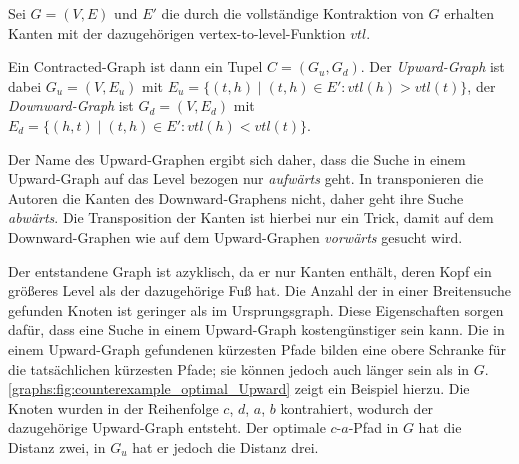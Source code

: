 \begin{definition}
  Sei $G = (V, E)$ und $E'$ die durch die vollständige Kontraktion von $G$ erhalten Kanten mit der dazugehörigen vertex-to-level-Funktion ${vtl}$.

  Ein Contracted-Graph ist dann ein Tupel $C = (G_u, G_d)$. Der \emph{Upward-Graph} ist dabei $G_u = (V, E_u)$ mit $E_u = \{ (t, h) \mid (t, h) \in E' \colon {vtl}(h) > {vtl}(t) \}$, der \emph{Downward-Graph} ist $G_d = (V, E_d)$ mit $E_d = \{ (h, t) \mid (t, h) \in E' \colon {vtl}(h) < {vtl}(t) \}$.
\end{definition}

Der Name des Upward-Graphen ergibt sich daher, dass die Suche in einem Upward-Graph auf das Level bezogen nur \emph{aufwärts} geht.
In \cite{geisberger2008contraction} transponieren die Autoren die Kanten des Downward-Graphens nicht, daher geht ihre Suche \emph{abwärts}.
Die Transposition der Kanten ist hierbei nur ein Trick, damit auf dem Downward-Graphen wie auf dem Upward-Graphen \emph{vorwärts} gesucht wird.

Der entstandene Graph ist azyklisch, da er nur Kanten enthält, deren Kopf ein größeres Level als der dazugehörige Fuß hat.
Die Anzahl der in einer Breitensuche gefunden Knoten ist geringer als im Ursprungsgraph.
Diese Eigenschaften sorgen dafür, dass eine Suche in einem Upward-Graph kostengünstiger sein kann.
Die in einem Upward-Graph gefundenen kürzesten Pfade bilden eine obere Schranke für die tatsächlichen kürzesten Pfade; sie können jedoch auch länger sein als in $G$.
\autoref{graphs:fig:counterexample_optimal_Upward} zeigt ein Beispiel hierzu.
Die Knoten wurden in der Reihenfolge $c$, $d$, $a$, $b$ kontrahiert, wodurch der dazugehörige Upward-Graph entsteht.
Der optimale $c$-$a$-Pfad in $G$ hat die Distanz zwei, in $G_u$ hat er jedoch die Distanz drei.

